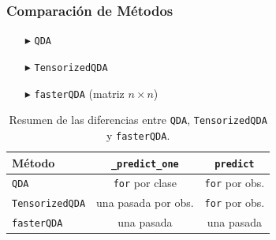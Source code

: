 \begin{frame}
  \frametitle{Comparación de Métodos}
  \begin{itemize}
    \item[$\blacktriangleright$] \texttt{QDA} 
    \item[$\blacktriangleright$] \texttt{TensorizedQDA}
    \item[$\blacktriangleright$] \texttt{fasterQDA} (matriz \(n \times n\))
  \end{itemize}

  \begin{table}[h!]
    \centering
    \begin{tabular}{@{}lcc@{}}
      \toprule
      \textbf{Método}       & \texttt{\_predict\_one}                    & \texttt{predict}                      \\ 
      \midrule
      \texttt{QDA}          & \texttt{for} por clase              & \texttt{for} por obs.    \\ 
      \texttt{TensorizedQDA}& una pasada por obs.                          &\texttt{for} por obs.    \\ 
      \texttt{fasterQDA}    & una pasada                          & una pasada                   \\ 
      \bottomrule
    \end{tabular}
    \caption{Resumen de las diferencias entre \texttt{QDA}, \texttt{TensorizedQDA} y \texttt{fasterQDA}.}
  \end{table}

\end{frame}

